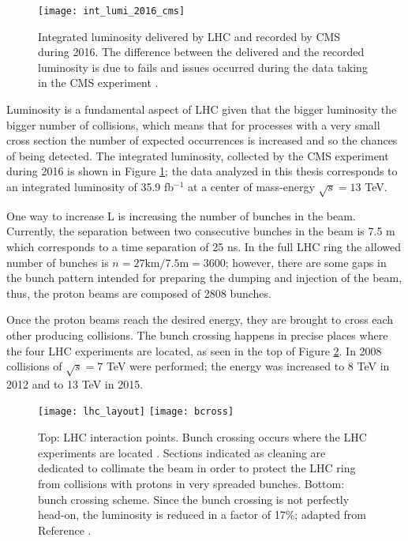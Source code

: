 \begin{figure}[!h]
\centering
\texttt{[image: int\_lumi\_2016\_cms]}
\caption [Integrated luminosity delivered by LHC and recorded by CMS during 2016]{Integrated luminosity delivered by LHC and recorded by CMS during 2016. The difference between the delivered and the recorded luminosity is due to fails and issues occurred during the data taking in the CMS experiment \cite{lumi}.}\label{fig:lumi}
\end{figure}

Luminosity is a fundamental aspect of LHC given that the bigger luminosity the bigger number of collisions, which means that for processes with a very small cross section the number of expected occurrences is increased and so the chances of being detected. The integrated luminosity, collected by the CMS experiment during 2016 is shown in Figure \ref{fig:lumi}; the data analyzed in this thesis corresponds to an integrated luminosity of 35.9 fb$^{-1}$ at a center of mass-energy $\sqrt{s}=13$ TeV.

One way to increase L is increasing the number of bunches in the beam. Currently, the separation between two consecutive bunches in the beam is 7.5 m which corresponds to a time separation of 25 ns. In the full LHC ring the allowed number of bunches is $n=27\textrm{km}/7.5\textrm{m}=3600$; however, there are some gaps in the bunch pattern intended for preparing the dumping and injection of the beam, thus, the proton beams are composed of 2808 bunches.

Once the proton beams reach the desired energy, they are brought to cross each other producing \pp collisions. The bunch crossing happens in precise places where the four LHC experiments are located, as seen in the top of Figure \ref{fig:lhc_layout}. In 2008 \pp collisions of $\sqrt{s}=7$ TeV were performed; the energy was increased to 8 TeV in 2012 and to 13 TeV in 2015.

\begin{figure}[!h]
\centering
\texttt{[image: lhc\_layout]}
\texttt{[image: bcross]}
\caption [LHC interaction points]{Top: LHC interaction points. Bunch crossing occurs where the LHC experiments are located \cite{lhc_layout}. Sections indicated as cleaning are dedicated to collimate the beam in order to protect the LHC ring from collisions with protons in very spreaded bunches. Bottom: bunch crossing scheme. Since the bunch crossing is not perfectly head-on, the luminosity is reduced in a factor of 17\%; adapted from Reference \cite{l1}.}\label{fig:lhc_layout}
\end{figure}

